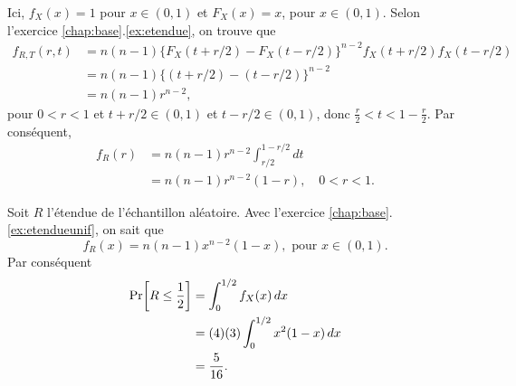 \begin{solution}{1.18}
Ici, $f_X(x)=1$ pour $x\in(0,1)$ et $F_X(x)=x$, pour $x\in(0,1)$. Selon l'exercice \ref{chap:base}.\ref{ex:etendue}, on trouve que
\begin{align*}
f_{R, T}(r, t) &= n (n - 1)\{ F_X(t + r/2) - F_X(t - r/2)\}^{n - 2}
    f_X(t + r/2) f_X(t - r/2)\\
&= n (n - 1)\{ (t + r/2) - (t - r/2)\}^{n - 2}\\
&= n (n - 1) r^{n-2},
\end{align*}
pour $0 < r < 1$ et $t + r/2 \in(0,1)$ et $t - r/2\in(0,1)$, donc $\frac{r}{2} < t < 1 - \frac{r}{2}$.
Par conséquent,
\begin{align*}
  f_R(r) &= n (n - 1) r^{n - 2} \int_{r/2}^{1 - r/2} dt \\
   &= n (n - 1) r^{n - 2} (1 - r), \quad 0 < r < 1.
  \end{align*}
%
\end{solution}
\begin{solution}{1.19}
    Soit $R$ l'étendue de l'échantillon aléatoire. Avec l'exercice \ref{chap:base}.\ref{ex:etendueunif}, on sait que
    \begin{displaymath}
      f_R(x) = n (n - 1) x^{n - 2} (1 - x), \mbox{ pour } x\in(0,1).
    \end{displaymath}
    Par conséquent
    \begin{align*}
      \mathrm{Pr}\! \left[ R \leq \frac{1}{2} \right]
      &= \int_{0}^{1/2} f_X(x)\, dx\\
      &= (4)(3)\int_{0}^{1/2} x^2 (1 - x)\, dx\\
      &= \frac{5}{16}.
    \end{align*}
  
\end{solution}
